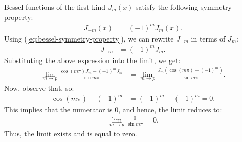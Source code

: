 Bessel functions of the first kind $\displaystyle J_m(x)$ satisfy the following symmetry property:
\begin{align}
    J_{-m}(x) &= (-1)^m J_m(x).\label{eq:bessel-symmetry-property}
\end{align}
Using (\ref{eq:bessel-symmetry-property}), we can rewrite $\displaystyle J_{-m}$ in terms of $\displaystyle J_m$:
\begin{align*}
    J_{-m} &= (-1)^m J_m.
\end{align*}
Substituting the above expression into the limit, we get:
\begin{align*}
    \lim_{m \to p} \frac{\cos(m\pi) J_m - (-1)^m J_m}{\sin m\pi}&=\lim_{m \to p} \frac{J_m \left(\cos(m\pi) - (-1)^m\right)}{\sin m\pi}.
\end{align*}
Now, observe that, so:
\begin{align*}
    \cos(m\pi) - (-1)^m &= (-1)^m - (-1)^m = 0.
\end{align*}
This implies that the numerator is 0, and hence, the limit reduces to:
\begin{align*}
    \lim_{m \to p} \frac{0}{\sin m\pi}=0.
\end{align*}
Thus, the limit exists and is equal to zero.
\bigskip\bigskip\hline\hline\bigskip
